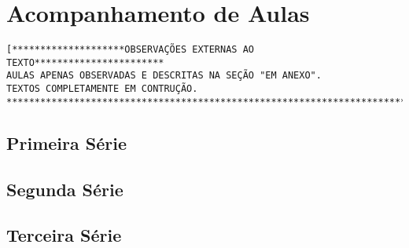 \chapter{Acompanhamento de Aulas}
\begin{verbatim}
[********************OBSERVAÇÕES EXTERNAS AO TEXTO***********************
AULAS APENAS OBSERVADAS E DESCRITAS NA SEÇÃO "EM ANEXO".
TEXTOS COMPLETAMENTE EM CONTRUÇÃO.
*************************************************************************]
\end{verbatim}
\section{Primeira Série}
\section{Segunda Série}
\section{Terceira Série}